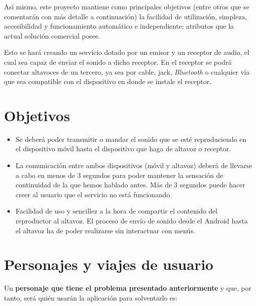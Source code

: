 Así mismo, este proyecto mantiene como principales objetivos (entre otros que se
comentarán con más detalle a continuación) la facilidad de utilización,
simpleza, accesibilidad y funcionamiento automático e independiente; atributos
que la actual solución comercial posee.

Esto se hará creando un servicio dotado por un emisor y un receptor de audio, el
cual sea capaz de enviar el sonido a dicho receptor. En el receptor se podrá
conectar altavoces de un tercero, ya sea por cable, jack, \emph{Bluetooth} o
cualquier vía que sea compatible con el dispositivo en donde se instale el
receptor.

\section{Objetivos}
\begin{itemize}
    \item Se deberá poder transmitir o mandar el sonido que se esté
    reproduciendo en el dispositivo móvil hasta el dispositivo que haga de
    altavoz o receptor.
    \item La comunicación entre ambos dispositivos (móvil y altavoz) deberá de
    llevarse a cabo en menos de 3 segundos para poder mantener la sensación de
    continuidad de la que hemos hablado antes. Más de 3 segundos puede hacer
    creer al usuario que el servicio no está funcionando.
    \item Facilidad de uso y sencillez a la hora de compartir el contenido del
    reproductor al altavoz. El proceso de envío de sonido desde el Android hasta
    el altavoz ha de poder realizarse sin interactuar con menús.
\end{itemize}

\section{Personajes y viajes de usuario}
Un \textbf{personaje que tiene el problema presentado anteriormente} y que, por tanto,
será quién usarán la aplicación para solventarlo es:

